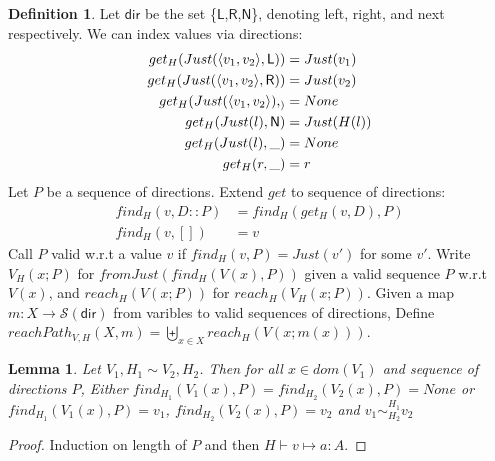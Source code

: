 \documentclass{easychair}
\newcommand{\ms}[1]{\ensuremath{\mathsf{#1}}}
\newcommand{\veq}[4]{#3 \sim^{#1}_{#2} #4}
\newtheorem{lemma}[theorem]{Lemma}
\theoremstyle{definition}
\newtheorem{definition}{Definition}
\begin{document}
\begin{definition}
	Let \ms{dir} be the set \{\ms{L},\ms{R},\ms{N}\}, denoting left, right, and next 
	respectively. We can index values via directions:
	\begin{align*}
		get_H(Just(\pairexcst{v_1}{v_2},\ms{L})) &= Just(v_1)\\
		get_H(Just(\pairexcst{v_1}{v_2},\ms{R})) &= Just(v_2)\\
		get_H(Just(\pairexcst{v_1}{v_2}),_) &= None\\
		get_H(Just(l),\ms{N}) &= Just(H(l)) \\
		get_H(Just(l), \_) &= None\\
		get_H(r,\_) &= r
	\end{align*}
	Let $P$ be a sequence of directions. Extend $get$ to sequence of directions:
	\begin{align*}
		find_H(v,D::P) &= find_H(get_H(v,D),P)\\
		find_H(v,[]) &= v
	\end{align*}
	Call $P$ valid w.r.t a value $v$ if $find_H(v,P) = Just (v')$ for some $v'$.
	Write $V_H(x;P)$ for $fromJust(find_H(V(x),P))$ given a valid sequence $P$ w.r.t $V(x)$,
	and $reach_H(V(x;P))$ for $reach_H(V_H(x;P))$.
	Given a map $m : X \to \mathcal{S}(\ms{dir})$ from varibles to valid sequences of directions, 
	Define $reachPath_{V,H}(X,m) = \biguplus_{x \in X} reach_H(V(x;m(x)))$.
	
\end{definition}

\begin{lemma}
	Let $V_1,H_1 \sim V_2,H_2$. Then for all $x \in dom(V_1)$ and sequence of directions $P$, 
	Either $find_{H_1}(V_1(x),P) = find_{H_2}(V_2(x),P) = None$ or 
	$find_{H_1}(V_1(x),P) = v_1$, $find_{H_2}(V_2(x),P) = v_2$ and
	$\veq{H_1}{H_2}{v_1}{v_2}$
\end{lemma}

\begin{proof}
	Induction on length of $P$ and then $H \vdash v \mapsto a : A$.
\end{proof}
\end{document}
